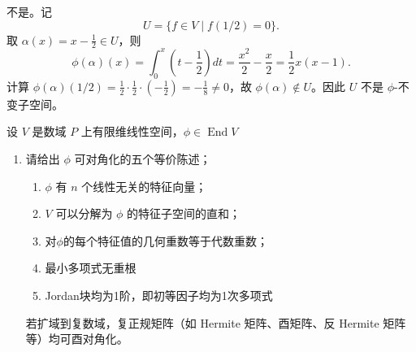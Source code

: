 \documentclass[lang=cn,12pt]{elegantbook}
\begin{document}
\begin{example}
\begin{enumerate}
        \begin{solution}
            不是。记
            \[
            U = \{ f \in V \mid f(1/2)=0 \}.
            \]
            取 \(\alpha(x) = x - \frac{1}{2} \in U\)，则
            \[
            \phi(\alpha)(x) = \int_0^x \left(t - \frac{1}{2}\right) dt = \frac{x^2}{2} - \frac{x}{2} = \frac{1}{2}x(x-1).
            \]
            计算 \(\phi(\alpha)(1/2) = \frac{1}{2} \cdot \frac{1}{2} \cdot (-\frac{1}{2}) = -\frac{1}{8} \neq 0\)，故 \(\phi(\alpha) \notin U\)。因此 \(U\) 不是 \(\phi\)-不变子空间。
        \end{solution}
    \end{enumerate} 
\end{example}

\begin{example}
    设 \(V\) 是数域 \(P\) 上有限维线性空间，\(\phi \in \operatorname{End}V\)
    \begin{enumerate}
        \item[(1)] 请给出 \(\phi\) 可对角化的五个等价陈述；
    
        \begin{solution}
            \begin{enumerate}
                \item  \(\phi\) 有 \(n\) 个线性无关的特征向量；
                \item \(V\) 可以分解为 \(\phi\) 的特征子空间的直和；
                \item 对$\phi$的每个特征值的几何重数等于代数重数；
                \item 最小多项式无重根
                \item Jordan块均为1阶，即初等因子均为1次多项式
            \end{enumerate}
            若扩域到复数域，复正规矩阵（如 Hermite 矩阵、酉矩阵、反 Hermite 矩阵等）均可酉对角化。
        \end{solution}
    

\end{enumerate}
\end{example}
\end{document}
